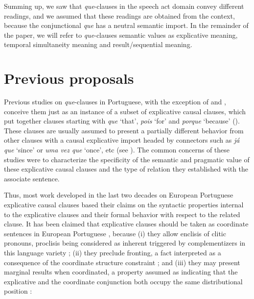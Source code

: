 \documentclass[output=paper,colorlinks,citecolor=brown,
]{langscibook}
\begin{document}
Summing up, we saw that \textit{que}-clauses in the speech act domain convey different readings, and we assumed that these readings are obtained from the context, because the conjunctional \textit{que} has a neutral semantic import. In the remainder of the paper, we will refer to \textit{que}-clauses semantic values as explicative meaning, temporal simultaneity meaning and result/sequential meaning. 

\section{Previous proposals} \label{sec:matos:sect3}

Previous studies on \textit{que}-clauses in Portuguese, with the exception of \citet{corr_ibero-romance_2016} and \citet{kocher_unselected_2019}, conceive them just as an instance of a subset of explicative causal clauses, which put together clauses starting with \textit{que} ‘that’, \textit{pois} ‘for’ and \textit{porque} ‘because’ (\citealt{cunha_nova_2001,neves_gramatica_2011,bechara_moderna_2019,lobo_aspectos_2003,matos_estruturas_2003,matos_coordenacao_2004,peres_notes_2005,lopes_contributos_2012,colaco_explicative_2016}). These clauses are usually assumed to present a partially different behavior from other clauses with a causal explicative import headed by connectors such as \textit{já que} ‘since’ or \textit{uma vez que} ‘once’, etc (see \citealt{lobo_aspectos_2003,lobo_subordinacao_2013}). The common concerns of these studies were to characterize the specificity of the semantic and pragmatic value of these explicative causal clauses and the type of relation they established with the associate sentence. 

Thus, most work developed in the last two decades on European Portuguese explicative causal clauses based their claims on the syntactic properties internal to the explicative clauses and their formal behavior with respect to the related clause. It has been claimed that explicative clauses should be taken as coordinate sentences in European Portuguese \citep{lobo_subordinacao_2013}, because (i) they allow enclisis of clitic pronouns, proclisis being considered as inherent triggered by complementizers in this language variety ; (ii) they preclude fronting, a fact interpreted as a consequence of the coordinate structure constraint \citep{ross_constraints_1967} ; and (iii) they may present marginal results when coordinated, a property assumed as indicating that the explicative and the coordinate conjunction both occupy the same distributional position :
\end{document}
